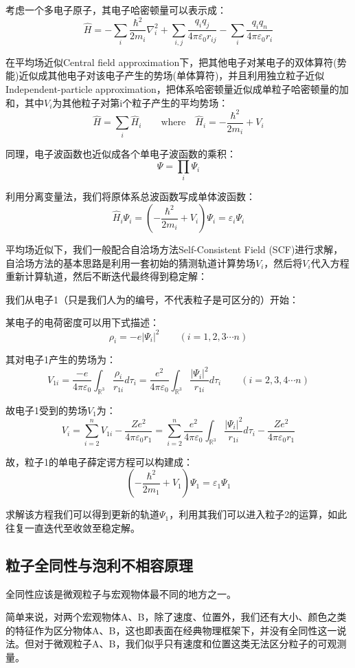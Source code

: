 考虑一个多电子原子，其电子哈密顿量可以表示成：
\[\hat{H}=-\sum_{i}\frac{\hbar^2}{2m_i}\nabla^2_i+\sum_{i,j}\frac{q_iq_j}{4 \pi \varepsilon_0 r_{ij}}-\sum_i\frac{q_iq_n}{4 \pi \varepsilon_0 r_{i}}\]

在平均场近似Central field approximation下，把其他电子对某电子的双体算符(势能)近似成其他电子对该电子产生的势场(单体算符)，并且利用独立粒子近似Independent-particle approximation，把体系哈密顿量近似成单粒子哈密顿量的加和，其中$V_i$为其他粒子对第i个粒子产生的平均势场：
\[\hat{H}=\sum_{i}\hat{H}_{i} \qquad \text{where} \quad \hat{H}_i=-\frac{\hbar^2}{2m_i}+V_i\]

同理，电子波函数也近似成各个单电子波函数的乘积：
\[\varPsi=\prod_i\varPsi_i\]

利用分离变量法，我们将原体系总波函数写成单体波函数：
\[\hat{H}_i\varPsi_i=\left ( -\frac{\hbar^2}{2m_i}+V_i \right ) \varPsi_i=\varepsilon_i\varPsi_i\]

平均场近似下，我们一般配合自洽场方法Self-Consistent Field (SCF)进行求解，自洽场方法的基本思路是利用一套初始的猜测轨道计算势场$V_i$，然后将$V_i$代入方程重新计算轨道，然后不断迭代最终得到稳定解：

我们从电子1（只是我们人为的编号，不代表粒子是可区分的）开始：

某电子的电荷密度可以用下式描述：
\[\rho_i=-e|\varPsi_i|^2 \qquad (i=1,2,3 \cdots n)\]

其对电子1产生的势场为：
\[V_{1i}=\frac{-e}{4 \pi \varepsilon_0}\int_{\mathbb{R}^3}\frac{\rho_i}{r_{1i}}d\tau_i=\frac{e^2}{4 \pi \varepsilon_0}\int_{\mathbb{R}^3}\frac{|\varPsi_i|^2}{r_{1i}}d\tau_i \qquad (i=2,3,4 \cdots n)\]

故电子1受到的势场$V_1$为：
\[V_i=\sum_{i=2}^nV_{1i}-\frac{Ze^2}{4 \pi \varepsilon_0r_1}=\sum_{i=2}^n\frac{e^2}{4 \pi \varepsilon_0}\int_{\mathbb{R}^3}\frac{|\varPsi_i|^2}{r_{1i}}d\tau_i-\frac{Ze^2}{4 \pi \varepsilon_0r_1}\]

故，粒子1的单电子薛定谔方程可以构建成：
\[\left ( -\frac{\hbar^2}{2m_1}+V_1 \right ) \varPsi_1=\varepsilon_1\varPsi_1\]

求解该方程我们可以得到更新的轨道$\varPsi_1$，利用其我们可以进入粒子2的运算，如此往复一直迭代至收敛至稳定解。

\subsection{粒子全同性与泡利不相容原理}
全同性应该是微观粒子与宏观物体最不同的地方之一。

简单来说，对两个宏观物体A、B，除了速度、位置外，我们还有大小、颜色之类的特征作为区分物体A、B，这也即表面在经典物理框架下，并没有全同性这一说法。但对于微观粒子A、B，我们似乎只有速度和位置这类无法区分粒子的可观测量。

